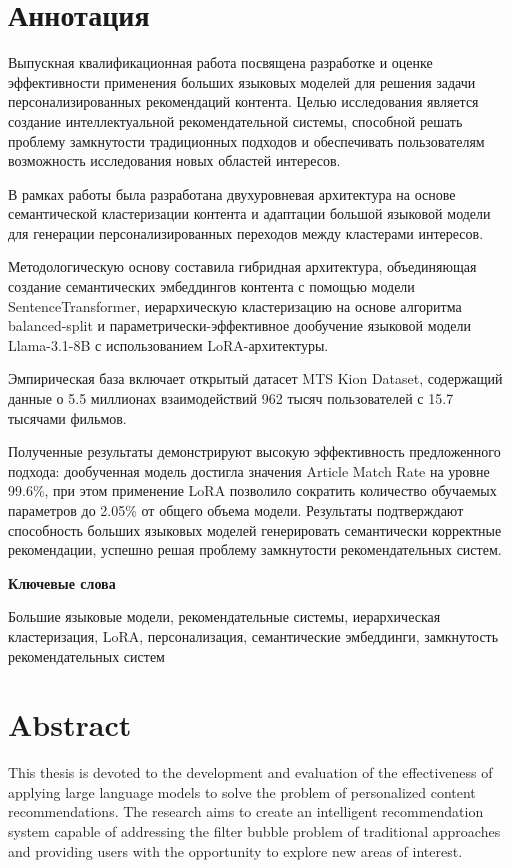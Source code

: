 \section*{Аннотация}

Выпускная квалификационная работа посвящена разработке и оценке эффективности применения больших языковых моделей для решения задачи персонализированных рекомендаций контента. Целью исследования является создание интеллектуальной рекомендательной системы, способной решать проблему замкнутости традиционных подходов и обеспечивать пользователям возможность исследования новых областей интересов.

В рамках работы была разработана двухуровневая архитектура на основе семантической кластеризации контента и адаптации большой языковой модели для генерации персонализированных переходов между кластерами интересов.

Методологическую основу составила гибридная архитектура, объединяющая создание семантических эмбеддингов контента с помощью модели SentenceTransformer, иерархическую кластеризацию на основе алгоритма balanced-split и параметрически-эффективное дообучение языковой модели Llama-3.1-8B с использованием LoRA-архитектуры.

Эмпирическая база включает открытый датасет MTS Kion Dataset, содержащий данные о 5.5 миллионах взаимодействий 962 тысяч пользователей с 15.7 тысячами фильмов.

Полученные результаты демонстрируют высокую эффективность предложенного подхода: дообученная модель достигла значения Article Match Rate на уровне 99.6\%, при этом применение LoRA позволило сократить количество обучаемых параметров до 2.05\% от общего объема модели. Результаты подтверждают способность больших языковых моделей генерировать семантически корректные рекомендации, успешно решая проблему замкнутости рекомендательных систем.

\textbf{Ключевые слова}

Большие языковые модели, рекомендательные системы, иерархическая кластеризация, LoRA, персонализация, семантические эмбеддинги, замкнутость рекомендательных систем 

\newpage
\section*{Abstract}

This thesis is devoted to the development and evaluation of the effectiveness of applying large language models to solve the problem of personalized content recommendations. The research aims to create an intelligent recommendation system capable of addressing the filter bubble problem of traditional approaches and providing users with the opportunity to explore new areas of interest.

